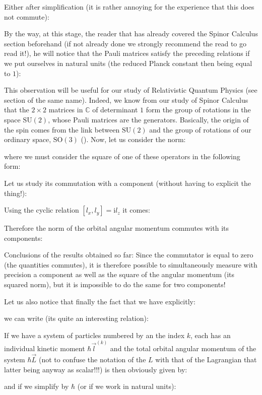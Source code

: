 	Either after simplification (it is rather annoying for the experience that this does not commute):
	
	By the way, at this stage, the reader that has already covered the Spinor Calculus section beforehand (if not already done we strongly recommend the read to go read it!), he will notice that the Pauli matrices satisfy the preceding relations if we put ourselves in natural units (the reduced Planck constant then being equal to $1$):
	
	This observation will be useful for our study of Relativistic Quantum Physics (see section of the same name). Indeed, we know from our study of Spinor Calculus that the $2\times 2$ matrices in $\mathbb{C}$ of determinant $1$ form the group of rotations in the space $\text{SU}(2)$, whose Pauli matrices are the generators. Basically, the origin of the spin comes from the link between $\text{SU}(2)$ and the group of rotations of our ordinary space, $\text{SO}(3)$ ().
	Now, let us consider the norm:
	
	where we must consider the square of one of these operators in the following form:
	
	Let us study its commutation with a component (without having to explicit the thing!):
	
	Using the cyclic relation $[l_x,l_y]=\mathrm{i}l_z$ it comes:
	
	Therefore the norm of the orbital angular momentum commutes with its components:
	
	Conclusions of the results obtained so far: Since the commutator is equal to zero (the quantities commutes), it is therefore possible to simultaneously measure with precision a component as well as the square of the angular momentum (its squared norm), but it is impossible to do the same for two components!
	
	Let us also notice that finally the fact that we have explicitly:
	
	we can write (its quite an interesting relation):
	
	If we have a system of particles numbered by an the index $k$, each has an individual kinetic moment $\hbar\vec{l}^{(k)}$ and the total orbital angular momentum of the system $\hbar\vec{L}$ (not to confuse the notation of the $L$ with that of the Lagrangian that latter being anyway as scalar!!!) is then obviously given by:
	
	and if we simplify by $\hbar$ (or if we work in natural units):
	
